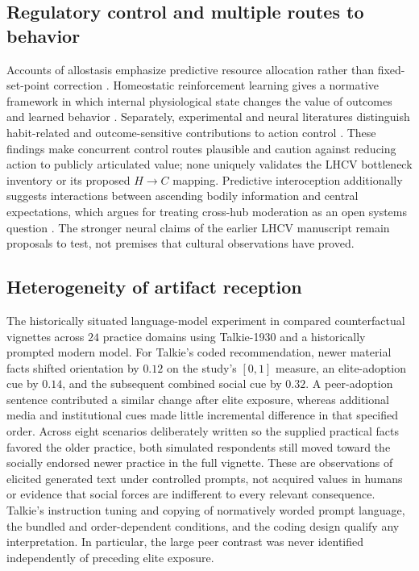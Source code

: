 \documentclass[11pt,a4paper]{article}
\begin{document}
\subsection{Regulatory control and multiple routes to behavior}
Accounts of allostasis emphasize predictive resource allocation rather than fixed-set-point correction \citep{sterling2012}. Homeostatic reinforcement learning gives a normative framework in which internal physiological state changes the value of outcomes and learned behavior \citep{keramati2014}. Separately, experimental and neural literatures distinguish habit-related and outcome-sensitive contributions to action control \citep{balleine2010,dolan2013}. These findings make concurrent control routes plausible and caution against reducing action to publicly articulated value; none uniquely validates the LHCV bottleneck inventory or its proposed $H\to C$ mapping. Predictive interoception additionally suggests interactions between ascending bodily information and central expectations, which argues for treating cross-hub moderation as an open systems question \citep{barrett2015}. The stronger neural claims of the earlier LHCV manuscript remain proposals to test, not premises that cultural observations have proved.

\subsection{Heterogeneity of artifact reception}
The historically situated language-model experiment in \citet{zarnckeTalkie} compared counterfactual vignettes across $24$ practice domains using Talkie-1930 and a historically prompted modern model. For Talkie's coded recommendation, newer material facts shifted orientation by $0.12$ on the study's $[0,1]$ measure, an elite-adoption cue by $0.14$, and the subsequent combined social cue by $0.32$. A peer-adoption sentence contributed a similar change after elite exposure, whereas additional media and institutional cues made little incremental difference in that specified order. Across eight scenarios deliberately written so the supplied practical facts favored the older practice, both simulated respondents still moved toward the socially endorsed newer practice in the full vignette. These are observations of elicited generated text under controlled prompts, not acquired values in humans or evidence that social forces are indifferent to every relevant consequence. Talkie's instruction tuning and copying of normatively worded prompt language, the bundled and order-dependent conditions, and the coding design qualify any interpretation. In particular, the large peer contrast was never identified independently of preceding elite exposure.
\end{document}
